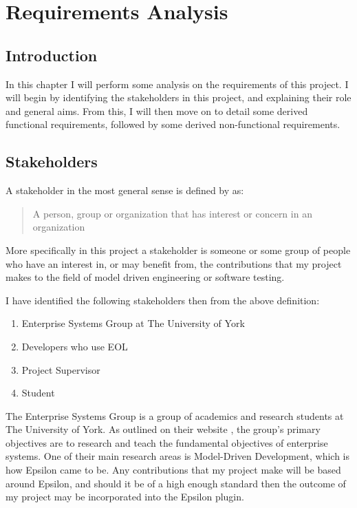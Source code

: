 \chapter{Requirements Analysis}

\section{Introduction}

In this chapter I will perform some analysis on the requirements of this project. I will begin by identifying the stakeholders in this project, and explaining their role and general aims. From this, I will then move on to detail some derived functional requirements, followed by some derived non-functional requirements.

\section{Stakeholders}
A stakeholder in the most general sense is defined by \citet{stakeholderDef} as:

\begin{quote}
	A person, group or organization that has interest or concern in an organization
\end{quote}

More specifically in this project a stakeholder is someone or some group of people who have an interest in, or may benefit from, the contributions that my project makes to the field of model driven engineering or software testing.

I have identified the following stakeholders then from the above definition:

\begin{enumerate}
\item Enterprise Systems Group at The University of York
\item Developers who use EOL
\item Project Supervisor
\item Student
\end{enumerate}

The Enterprise Systems Group is a group of academics and research students at The University of York. As outlined on their website \cite{ESG}, the group's primary objectives are to research and teach the fundamental objectives of enterprise systems. One of their main research areas is Model-Driven Development, which is how Epsilon came to be. Any contributions that my project make will be based around Epsilon, and should it be of a high enough standard then the outcome of my project may be incorporated into the Epsilon plugin.

